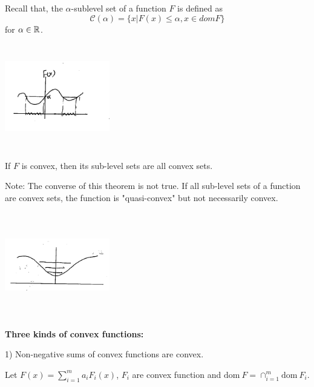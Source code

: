 \begin{definition} Recall that, the $\alpha$-sublevel set of a function $F$ is defined as
	$$\mathcal{C}(\alpha) = \{x|F(x)\leq \alpha, x\in domF \}$$
	for $\alpha\in\mathbb{R}$.
	\begin{marginfigure}
	\centering
	\includegraphics[width=1.8in,height=1.8in]{figures/ch08/figure1030_12.png}
	\end{marginfigure}
\end{definition}

\begin{theorem}
	If $F$ is convex, then its sub-level sets are all convex sets.
\end{theorem}
Note: The converse of this theorem is not true. If all sub-level sets of a function are convex sets, the function is "quasi-convex" but not necessarily convex.\\

\begin{marginfigure}
	\centering
	\includegraphics[width=1.8in,height=1.8in]{figures/ch08/figure1030_13.png}
\end{marginfigure}

\vspace{0.3cm}
\noindent \textbf{Three kinds of convex functions:}

1) Non-negative sums of convex functions are convex.

Let $F(x) =\sum^m_{i=1}a_iF_i(x)$, $F_i$ are convex function and $\text{dom}\ F = \cap^m_{i=1}\text{dom}\ F_i$. 

